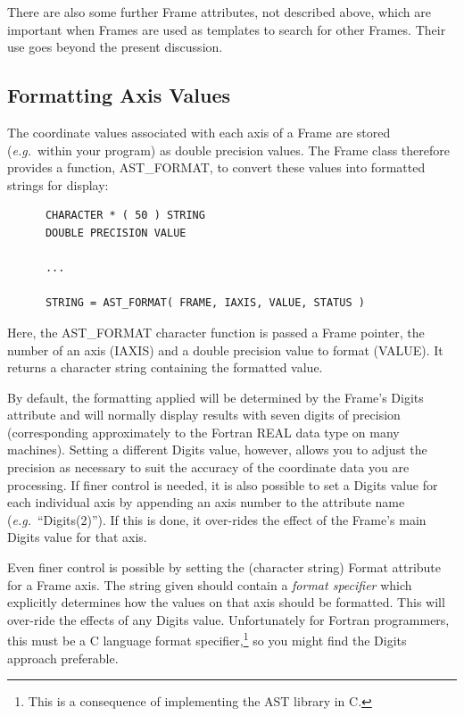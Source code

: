 \documentclass[twoside,11pt]{article}
\newcommand{\htmlref}[2]{#1}
\begin{document}
There are also some further Frame attributes, not described above,
which are important when Frames are used as templates to search for
other Frames. Their use goes beyond the present discussion.

\subsection{\label{ss:formattingaxisvalues}Formatting Axis Values}

The coordinate values associated with each axis of a \htmlref{Frame}{Frame} are stored
({\em{e.g.}}\ within your program) as double precision values. The
Frame class therefore provides a function, \htmlref{AST\_FORMAT}{AST_FORMAT}, to convert
these values into formatted strings for display:

\small
\begin{verbatim}
      CHARACTER * ( 50 ) STRING
      DOUBLE PRECISION VALUE

      ...

      STRING = AST_FORMAT( FRAME, IAXIS, VALUE, STATUS )
\end{verbatim}
\normalsize

Here, the AST\_FORMAT character function is passed a Frame pointer,
the number of an axis (IAXIS) and a double precision value to format
(VALUE). It returns a character string containing the formatted value.
\label{ss:formattingwithdigits}

By default, the formatting applied will be determined by the Frame's
Digits attribute and will normally display results with seven digits
of precision (corresponding approximately to the Fortran REAL data
type on many machines). Setting a different Digits value, however,
allows you to adjust the precision as necessary to suit the accuracy
of the coordinate data you are processing.  If finer control is
needed, it is also possible to set a Digits value for each individual
axis by appending an axis number to the attribute name
({\em{e.g.}}\ ``Digits(2)''). If this is done, it over-rides the
effect of the Frame's main Digits value for that axis.

Even finer control is possible by setting the (character string)
Format attribute for a Frame axis. The string given should contain a
{\em{format specifier}} which explicitly determines how the values on
that axis should be formatted. This will over-ride the effects of any
Digits value.  Unfortunately for Fortran programmers, this must be a C
language format specifier,\footnote{This is a consequence of
implementing the AST library in C.} so you might find the Digits
approach preferable.
\end{document}
